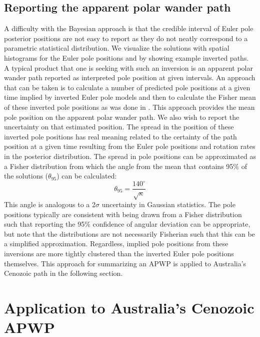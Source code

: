\documentclass[11pt,letterpaper]{article}
\begin{document}
\subsection*{Reporting the apparent polar wander path}
\label{sec:age_uncertainty}
A difficulty with the Bayesian approach is that the credible interval of Euler pole posterior positions are not easy to report as they do not neatly correspond to a parametric statistical distribution. We visualize the solutions with spatial histograms for the Euler pole positions and by showing example inverted paths. A typical product that one is seeking with such an inversion is an apparent polar wander path reported as interpreted pole position at given intervals. An approach that can be taken is to calculate a number of predicted pole positions at a given time implied by inverted Euler pole models and then to calculate the Fisher mean of these inverted pole positions as was done in \citet{Swanson-Hysell2019a}. This approach provides the mean pole position on the apparent polar wander path. We also wish to report the uncertainty on that estimated position. The spread in the position of these inverted pole positions has real meaning related to the certainty of the path position at a given time resulting from the Euler pole positions and rotation rates in the posterior distribution. The spread in pole positions can be approximated as a Fisher distribution from which the angle from the mean that contains 95$\%$ of the solutions ($\theta_{95}$) can be calculated:
\begin{equation}
\theta_{95}=\frac{140^{\circ}}{\sqrt{\kappa}}
\label{eq:angular_deviation}
\end{equation}
This angle is analogous to a 2$\sigma$ uncertainty in Gaussian statistics.  The pole positions typically are consistent with being drawn from a Fisher distribution such that reporting the 95$\%$ confidence of angular deviation can be appropriate, but note that the distributions are not necessarily Fisherian such that this can be a simplified approximation. Regardless, implied pole positions from these inversions are more tightly clustered than the inverted Euler pole positions themselves. This approach for summarizing an APWP is applied to Australia's Cenozoic path in the following section.

\section*{Application to Australia's Cenozoic APWP}
\label{sec:australia}
\end{document}
